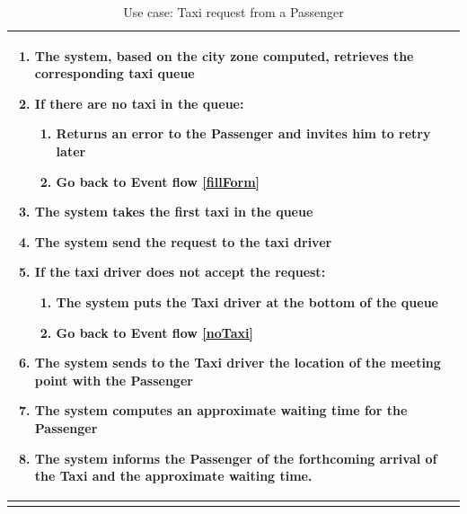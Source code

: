 \begin{center}
\begin{longtable}{| p{} | p{} |}
\begin{enumerate}
				\item The system, based on the city zone computed, retrieves the corresponding taxi queue
				\item If there are no taxi in the queue: \label{noTaxi}
				\begin{enumerate}
					\item Returns an error to the Passenger and invites him to retry later
					\item Go back to Event flow \ref{fillForm}
				\end{enumerate}
				\item The system takes the first taxi in the queue
				\item The system send the request to the taxi driver
				\item If the taxi driver does not accept the request:
				\begin{enumerate}
					\item The system puts the Taxi driver at the bottom of the queue
					\item Go back to Event flow \ref{noTaxi}
				\end{enumerate}
				\item The system sends to the Taxi driver the location of the meeting point with the Passenger
				\item The system computes an approximate waiting time for the Passenger
				\item The system informs the Passenger of the forthcoming arrival of the Taxi and the approximate waiting time.
			\end{enumerate} 
\\ \hline
\caption{Use case: Taxi request from a Passenger}
\label{requestTaxiUC}
\end{longtable}

\end{center}
